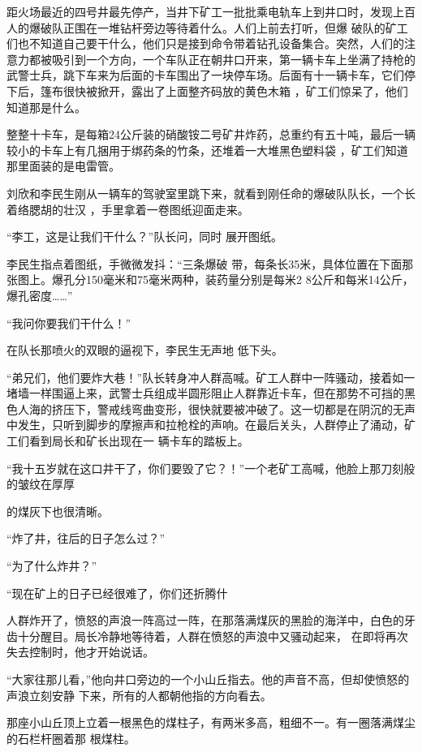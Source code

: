 \documentclass{article}
\begin{document}
距火场最近的四号井最先停产，当井下矿工一批批乘电轨车上到井口时，发现上百人的爆破队正围在一堆钻杆旁边等待着什么。人们上前去打听，但爆
\newpage
破队的矿工们也不知道自己要干什么，他们只是接到命令带着钻孔设备集合。突然，人们的注意力都被吸引到一个方向，一个车队正在朝井口开来，第一辆卡车上坐满了持枪的武警士兵，跳下车来为后面的卡车围出了一块停车场。后面有十一辆卡车，它们停下后，篷布很快被掀开，露出了上面整齐码放的黄色木箱
，矿工们惊呆了，他们知道那是什么。 

整整十卡车，是每箱24公斤装的硝酸铵二号矿井炸药，总重约有五十吨，最后一辆较小的卡车上有几捆用于绑药条的竹条，还堆着一大堆黑色塑料袋
，矿工们知道那里面装的是电雷管。 

刘欣和李民生刚从一辆车的驾驶室里跳下来，就看到刚任命的爆破队队长，一个长着络腮胡的壮汉
，手里拿着一卷图纸迎面走来。 

“李工，这是让我们干什么？”队长问，同时
展开图纸。 

李民生指点着图纸，手微微发抖：“三条爆破
\newpage
带，每条长35米，具体位置在下面那张图上。爆孔分150毫米和75毫米两种，装药量分别是每米2
8公斤和每米14公斤，爆孔密度……” 


“我问你要我们干什么！” 

在队长那喷火的双眼的逼视下，李民生无声地
低下头。 

“弟兄们，他们要炸大巷！”队长转身冲人群高喊。矿工人群中一阵骚动，接着如一堵墙一样围逼上来，武警士兵组成半圆形阻止人群靠近卡车，但在那势不可挡的黑色人海的挤压下，警戒线弯曲变形，很快就要被冲破了。这一切都是在阴沉的无声中发生，只听到脚步的摩擦声和拉枪栓的声响。在最后关头，人群停止了涌动，矿工们看到局长和矿长出现在一
辆卡车的踏板上。 

“我十五岁就在这口井干了，你们要毁了它？！”一个老矿工高喊，他脸上那刀刻般的皱纹在厚厚

\newpage
的煤灰下也很清晰。 


“炸了井，往后的日子怎么过？” 


“为了什么炸井？” 

“现在矿上的日子已经很难了，你们还折腾什


人群炸开了，愤怒的声浪一阵高过一阵，在那落满煤灰的黑脸的海洋中，白色的牙齿十分醒目。局长冷静地等待着，人群在愤怒的声浪中又骚动起来，
在即将再次失去控制时，他才开始说话。 

“大家往那儿看，”他向井口旁边的一个小山丘指去。他的声音不高，但却使愤怒的声浪立刻安静
下来，所有的人都朝他指的方向看去。 

那座小山丘顶上立着一根黑色的煤柱子，有两米多高，粗细不一。有一圈落满煤尘的石栏杆圈着那
根煤柱。 
\end{document}
